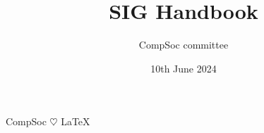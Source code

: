 \documentclass{article}
\title{SIG Handbook}
\author{CompSoc committee}
\date{10th June 2024}
\begin{document}
\maketitle
\tableofcontents
\newpage










\vfill
CompSoc $\heartsuit$ \LaTeX
\end{document}
